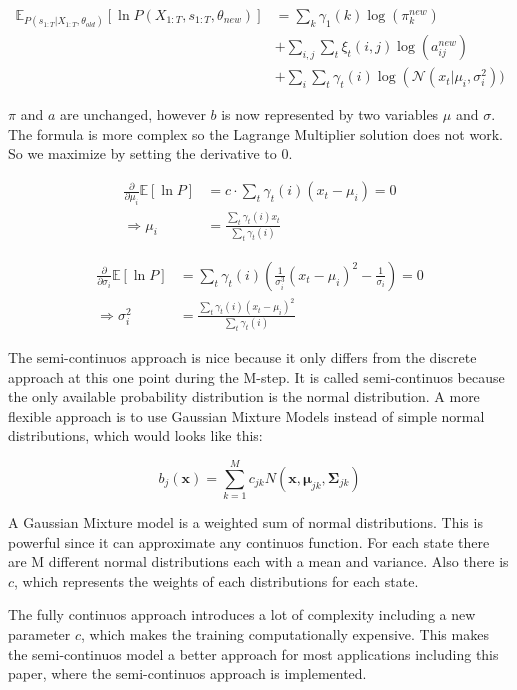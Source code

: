 \begin{equation}
\begin{aligned}
\mathbb{E}_{P\left(s_{1: T} | X_{1: T}, \theta_{o l d}\right)}\left[\ln P\left(X_{1: T}, s_{1: T}, \theta_{n e w}\right)\right] &=\sum_{k} \gamma_{1}(k) \log \left(\pi_{k}^{n e w}\right) \\
&+\sum_{i, j} \sum_{t} \xi_{t}(i, j) \log \left(a_{i j}^{n e w}\right) \\
&+\sum_{i} \sum_{t} \gamma_{t}(i)    \log \left(\mathcal{N}\left(x_{t} | \mu_{i}, \sigma_{i}^{2}\right)\right.  )
\end{aligned}
\end{equation}

$\pi$ and $a$ are unchanged, however $b$ is now represented by two variables $\mu$ and $\sigma$. The formula is more complex so the Lagrange Multiplier solution does not work. So we maximize by setting the derivative to 0. 

\begin{equation}
\begin{aligned}
\frac{\partial}{\partial \mu_i} \mathbb{E}[\ln P] &= c \cdot \sum_t \gamma_t(i) (x_t - \mu_i) = 0 \\
\Rightarrow \mu_i &= \frac{\sum_t \gamma_t(i)x_t}{\sum_t \gamma_t(i)}
\end{aligned}
\label{eq:mu-def}
\end{equation}

\begin{equation}
\begin{aligned}
\frac{\partial}{\partial \sigma_i} \mathbb{E}[\ln P] &= \sum_t \gamma_t(i) (\frac{1}{\sigma_i^3}(x_t-\mu_i)^2 - \frac{1}{\sigma_i}) = 0 \\
\Rightarrow \sigma_i^2 &= \frac{\sum_t \gamma_t(i)(x_t - \mu_i)^2}{\sum_t \gamma_t(i)}
\end{aligned}
\label{eq:sigma-def}
\end{equation}

The semi-continuos approach is nice because it only differs from the discrete approach at this one point during the M-step. It is called semi-continuos because the only available probability distribution is the normal distribution. A more flexible approach is to use Gaussian Mixture Models instead of simple normal distributions, which would looks like this: 

\begin{equation}
  b_{j}(\mathbf{x})=\sum_{k=1}^{M} c_{j k} N\left(\mathbf{x}, \boldsymbol{\mu}_{j k}, \boldsymbol{\Sigma}_{j k}\right) 
\end{equation}

A Gaussian Mixture model is a weighted sum of normal distributions. This is powerful since it can approximate any continuos function. For each state there are M different normal distributions each with a mean and variance. Also there is $c$, which represents the weights of each distributions for each state. 

The fully continuos approach introduces a lot of complexity including a new parameter $c$, which makes the training computationally expensive. This makes the semi-continuos model a better approach for most applications including this paper, where the semi-continuos approach is implemented. \parencite{huang2001spoken}
